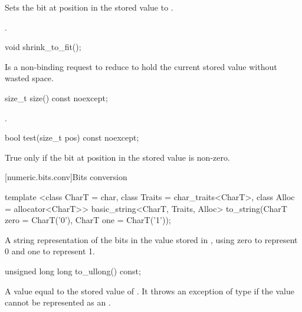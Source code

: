 \begin{addedblock}
\begin{itemdescr}
\effects Sets the bit at position  in the stored value to .

\returns {}.
\end{itemdescr}

\begin{itemdecl}
void shrink_to_fit();
\end{itemdecl}

\begin{itemdescr}
\effects Is a non-binding request to reduce  to hold the current stored value without wasted space.
\end{itemdescr}

\begin{itemdecl}
size_t size() const noexcept;
\end{itemdecl}

\begin{itemdescr}
\returns {}.
\end{itemdescr}

\begin{itemdecl}
bool test(size_t pos) const noexcept;
\end{itemdecl}

\begin{itemdescr}
\returns True only if the bit at position  in the stored value is non-zero.
\end{itemdescr}

[numeric.bits.conv]{Bits conversion}

\begin{itemdecl}
template <class CharT = char, class Traits = char_traits<CharT>, class Alloc = allocator<CharT>>
  basic_string<CharT, Traits, Alloc> to_string(CharT zero = CharT('0'),
                                               CharT one = CharT('1'));
\end{itemdecl}

\begin{itemdescr}
\returns A string representation of the bits in the value stored in , using zero to represent 0 and one to represent 1.
\end{itemdescr}

\begin{itemdecl}
unsigned long long to_ullong() const;
\end{itemdecl}

\begin{itemdescr}
\returns A value equal to the stored value of . It throws an exception of type  if the value cannot be represented as an .
\end{itemdescr}


\end{addedblock}
